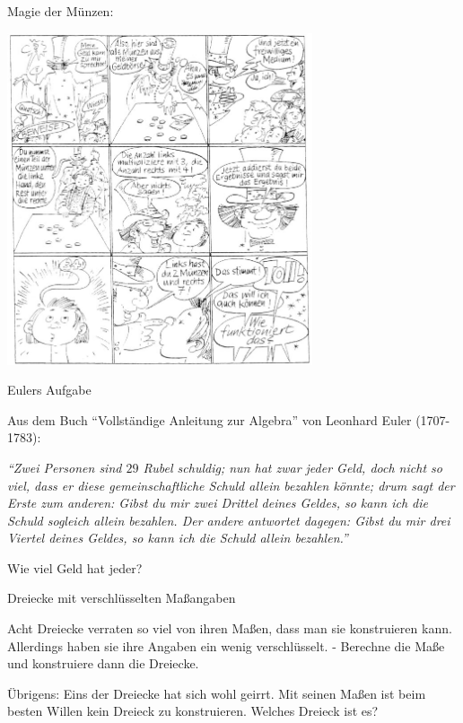 \documentclass[a4paper, twoside, parskip, 10pt, smallheadings]{scrbook}
\theoremstyle{plain}
\theoremstyle{definition}
\begin{document}
\item Magie der Münzen:

\begin{center}
\includegraphics[width=9cm]{2te/linearegleichungssysteme/bilder/zauberer.jpg}
\end{center} 



\item Eulers Aufgabe

Aus dem Buch "`Vollständige Anleitung zur Algebra"' von Leonhard Euler (1707-1783):

{\it "`Zwei Personen sind $29$ Rubel schuldig; nun hat zwar jeder Geld, doch nicht so viel, dass er diese gemeinschaftliche Schuld allein bezahlen könnte; drum sagt der Erste zum anderen: Gibst du mir zwei Drittel deines Geldes, so kann ich die Schuld sogleich allein bezahlen. Der andere antwortet dagegen: Gibst du mir drei Viertel deines Geldes, so kann ich die Schuld allein bezahlen."'}

Wie viel Geld hat jeder?






\item Dreiecke mit verschlüsselten Maßangaben

Acht Dreiecke verraten so viel von ihren Maßen, dass man sie konstruieren kann. Allerdings haben sie ihre Angaben ein wenig verschlüsselt. - Berechne die Maße und konstruiere dann die Dreiecke.

Übrigens: Eins der Dreiecke hat sich wohl geirrt. Mit seinen Maßen ist beim besten Willen kein Dreieck zu konstruieren. Welches Dreieck ist es?
\end{document}
